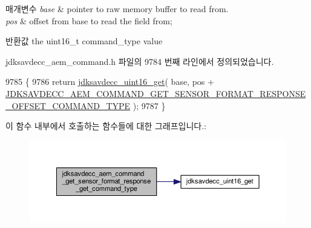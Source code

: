 \begin{DoxyParams}{매개변수}
{\em base} & pointer to raw memory buffer to read from. \\
\hline
{\em pos} & offset from base to read the field from; \\
\hline
\end{DoxyParams}
\begin{DoxyReturn}{반환값}
the uint16\+\_\+t command\+\_\+type value 
\end{DoxyReturn}


jdksavdecc\+\_\+aem\+\_\+command.\+h 파일의 9784 번째 라인에서 정의되었습니다.


\begin{DoxyCode}
9785 \{
9786     \textcolor{keywordflow}{return} \hyperlink{group__endian_ga3fbbbc20be954aa61e039872965b0dc9}{jdksavdecc\_uint16\_get}( base, pos + 
      \hyperlink{group__command__get__sensor__format__response_ga3b6c3b3a1c1231a32dcb997b8c99ae5f}{JDKSAVDECC\_AEM\_COMMAND\_GET\_SENSOR\_FORMAT\_RESPONSE\_OFFSET\_COMMAND\_TYPE}
       );
9787 \}
\end{DoxyCode}


이 함수 내부에서 호출하는 함수들에 대한 그래프입니다.\+:
\nopagebreak
\begin{figure}[H]
\begin{center}
\leavevmode
\includegraphics[width=350pt]{group__command__get__sensor__format__response_ga52a2704e6034325084e190ce51703280_cgraph}
\end{center}
\end{figure}


